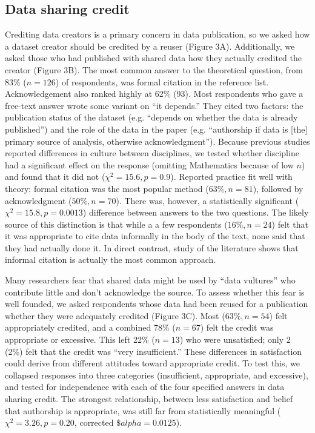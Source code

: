 \documentclass[10pt]{article}
\begin{document}
\subsection*{Data sharing credit}

Crediting data creators is a primary concern in data publication, so we asked how a dataset creator should be credited by a reuser (Figure 3A).
Additionally, we asked those who had published with shared data how they actually credited the creator (Figure 3B).
The most common answer to the theoretical question, from 83\% ($n=126$) of respondents, was formal citation in the reference list.
Acknowledgement also ranked highly at 62\% (93).
Most respondents who gave a free-text answer wrote some variant on ``it depends.''
They cited two factors: the publication status of the dataset (e.g. ``depends on whether the data is already published'') and the role of the data in the paper (e.g. ``authorship if data is [the] primary source of analysis, otherwise acknowledgment'').
Because previous studies reported differences in culture between disciplines\cite{swan_share_2008, harley_assessing_2010, tenopir_data_2011}, we tested whether discipline had a significant effect on the response  (omitting Mathematics because of low $n$) and found that it did not ($\chi^{2}=15.6, p=0.9$).
Reported practice fit well with theory: formal citation was the most popular method ($63\%, n=81$), followed by acknowledgment ($50\%, n=70$).
There was, however, a statistically significant ($\chi^{2}=15.8, p=0.0013$) difference between answers to the two questions.
The likely source of this distinction is that while a a few respondents ($16\%, n=24$) felt that it was appropriate to cite data informally in the body of the text, none said that they had actually done it.
In direct contrast, study of the literature shows that informal citation is actually the most common approach\cite{sieber_not_1995, mooney_anatomy_2012}.

Many researchers fear that shared data might be used by ``data vultures'' who contribute little and don't acknowledge the source\cite{kim_insitutional_2012}.
To assess whether this fear is well founded, we asked respondents whose data had been reused for a publication whether they were adequately credited (Figure 3C).
Most ($63\%, n=54$) felt appropriately credited, and a combined 78\% ($n=67$) felt the credit was appropriate or excessive.
This left 22\% ($n=13$) who were unsatisfied; only 2 (2\%) felt that the credit was ``very insufficient.''
These differences in satisfaction could derive from different attitudes toward appropriate credit.  
To test this, we collapsed responses into three categories (insufficient, appropriate, and excessive), and tested for independence with each of the four specified answers in data sharing credit.
The strongest relationship, between less satisfaction and belief that authorship is appropriate, was still far from statistically meaningful ($\chi^{2}= 3.26, p= 0.20$, corrected $\$alpha= 0.0125$).
\end{document}
